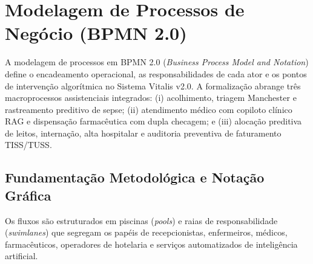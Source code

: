 
\section{Modelagem de Processos de Negócio (BPMN 2.0)}
\label{sec:bpmn}

A modelagem de processos em BPMN 2.0 (\textit{Business Process Model and Notation}) \cite{omg_bpmn:2011} define o encadeamento operacional, as responsabilidades de cada ator e os pontos de intervenção algorítmica no Sistema Vitalis v2.0. A formalização abrange três macroprocessos assistenciais integrados: (i) acolhimento, triagem Manchester e rastreamento preditivo de sepse; (ii) atendimento médico com copiloto clínico RAG e dispensação farmacêutica com dupla checagem; e (iii) alocação preditiva de leitos, internação, alta hospitalar e auditoria preventiva de faturamento TISS/TUSS.

\subsection{Fundamentação Metodológica e Notação Gráfica}
\label{subsec:bpmn_fundamentacao}

Os fluxos são estruturados em piscinas (\textit{pools}) e raias de responsabilidade (\textit{swimlanes}) que segregam os papéis de recepcionistas, enfermeiros, médicos, farmacêuticos, operadores de hotelaria e serviços automatizados de inteligência artificial.

